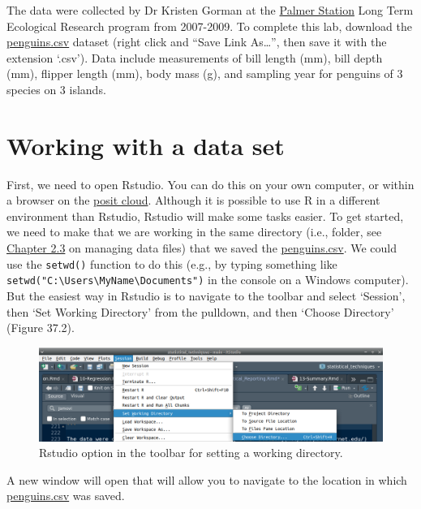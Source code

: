 \documentclass[
]{scrbook}
\begin{document}
The data were collected by Dr Kristen Gorman at the \href{https://pal.lternet.edu/}{Palmer Station} Long Term Ecological Research program from 2007-2009.
To complete this lab, download the \href{https://raw.githubusercontent.com/bradduthie/SCIU4T4/main/data/penguins.csv}{penguins.csv} dataset (right click and ``Save Link As\ldots{}'', then save it with the extension `.csv').
Data include measurements of bill length (mm), bill depth (mm), flipper length (mm), body mass (g), and sampling year for penguins of 3 species on 3 islands.

\hypertarget{working-with-a-data-set}{%
\section{Working with a data set}\label{working-with-a-data-set}}

First, we need to open Rstudio.
You can do this on your own computer, or within a browser on the \href{https://posit.cloud/}{posit cloud}.
Although it is possible to use R in a different environment than Rstudio, Rstudio will make some tasks easier.
To get started, we need to make that we are working in the same directory (i.e., folder, see \protect\hyperlink{managing-data-files}{Chapter 2.3} on managing data files) that we saved the \href{https://raw.githubusercontent.com/bradduthie/SCIU4T4/main/data/penguins.csv}{penguins.csv}.
We could use the \texttt{setwd()} function to do this (e.g., by typing something like \texttt{setwd("C:\textbackslash{}Users\textbackslash{}MyName\textbackslash{}Documents")} in the console on a Windows computer).
But the easiest way in Rstudio is to navigate to the toolbar and select `Session', then `Set Working Directory' from the pulldown, and then `Choose Directory' (Figure 37.2).

\begin{figure}
\includegraphics[width=1\linewidth]{img/Rstudio_setwd} \caption{Rstudio option in the toolbar for setting a working directory.}\label{fig:unnamed-chunk-218}
\end{figure}

A new window will open that will allow you to navigate to the location in which \href{https://raw.githubusercontent.com/bradduthie/SCIU4T4/main/data/penguins.csv}{penguins.csv} was saved.
\end{document}
